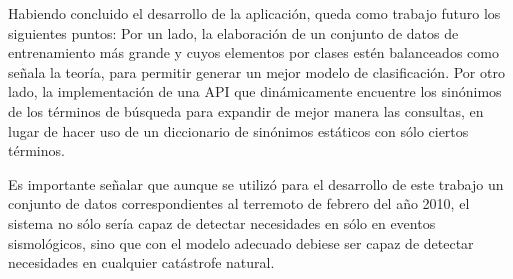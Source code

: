 Habiendo concluido el desarrollo de la aplicación, queda como trabajo futuro los siguientes puntos: Por un lado, la elaboración de un conjunto de datos de entrenamiento más grande y cuyos elementos por clases estén balanceados como señala la teoría, para permitir generar un mejor modelo de clasificación. Por otro lado, la implementación de una API que dinámicamente encuentre los sinónimos de los términos de búsqueda para expandir de mejor manera las consultas, en lugar de hacer uso de un diccionario de sinónimos estáticos con sólo ciertos términos.

Es importante señalar que aunque se utilizó para el desarrollo de este trabajo un conjunto de datos correspondientes al terremoto de febrero del año 2010, el sistema no sólo sería capaz de detectar necesidades en sólo en eventos sismológicos, sino que con el modelo adecuado debiese ser capaz de detectar necesidades en cualquier catástrofe natural.

	





